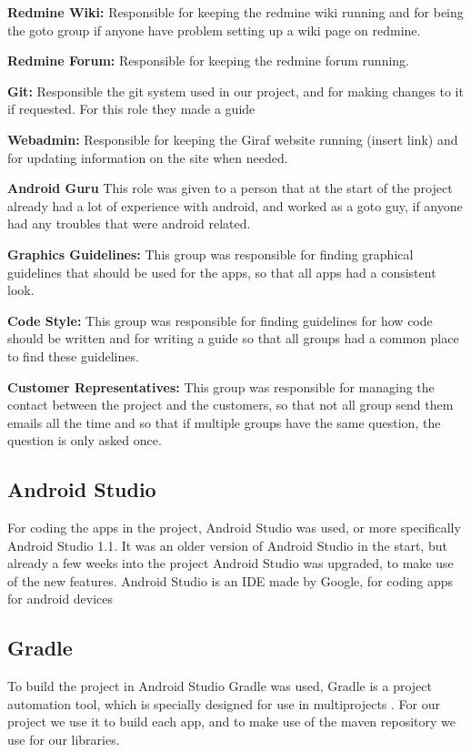 \textbf{Redmine Wiki:}
Responsible for keeping the redmine wiki running and for being the goto group if anyone have problem setting up a wiki page on redmine.

\textbf{Redmine Forum:}
Responsible for keeping the redmine forum running.
 
\textbf{Git:}
Responsible the git system used in our project, and for making changes to it if requested. For this role they made a guide

\textbf{Webadmin:}
Responsible for keeping the Giraf website running (insert link) and for updating information on the site when needed.

\textbf{Android Guru}
This role was given to a person that at the start of the project already had a lot of experience with android, and worked as a goto guy, if anyone had any troubles that were android related.

\textbf{Graphics Guidelines:}
This group was responsible for finding graphical guidelines that should be used for the apps, so that all apps had a consistent look.

\textbf{Code Style:}
This group was responsible for finding guidelines for how code should be written and for writing a guide so that all groups had a common place to find these guidelines.


\textbf{Customer Representatives:}
This group was responsible for managing the contact between the project and the customers, so that not all group send them emails all the time and so that if multiple groups have the same question, the question is only asked once.


\subsection{Android Studio}
For coding the apps in the project, Android Studio was used, or more specifically Android Studio 1.1. It was an older version of Android Studio in the start, but already a few weeks into the project Android Studio was upgraded, to make use of the new features. Android Studio is an IDE made by Google, for coding apps for android devices \citep{AndroidStudio}

\subsection{Gradle}
To build the project in Android Studio Gradle was used, Gradle is a project automation tool, which is specially designed for use in multiprojects \citep{Gradle}. For our project we use it to build each app, and to make use of the maven repository we use for our libraries.

